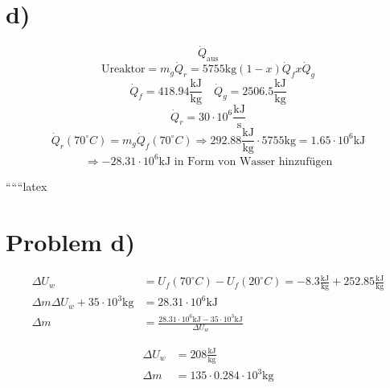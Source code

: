 

\section*{d)}
\[
\dot{Q}_{\text{aus}}
\]
\[
\text{Ureaktor} = m_g \dot{Q}_r = 5755 \text{kg} (1 - x) \dot{Q}_f x \dot{Q}_g
\]
\[
\dot{Q}_f = 418.94 \frac{\text{kJ}}{\text{kg}} \quad \dot{Q}_g = 2506.5 \frac{\text{kJ}}{\text{kg}}
\]
\[
\dot{Q}_r = 30 \cdot 10^6 \frac{\text{kJ}}{\text{s}}
\]
\[
\dot{Q}_r (70^\circ C) = m_g \dot{Q}_f (70^\circ C) \Rightarrow 292.88 \frac{\text{kJ}}{\text{kg}} \cdot 5755 \text{kg} = 1.65 \cdot 10^6 \text{kJ}
\]
\[
\Rightarrow -28.31 \cdot 10^6 \text{kJ} \text{ in Form von Wasser hinzufügen}
\]

``````latex

\section*{Problem d)}

\begin{align*}
\Delta U_w &= U_f(70^\circ C) - U_f(20^\circ C) = -8.3 \frac{\text{kJ}}{\text{kg}} + 252.85 \frac{\text{kJ}}{\text{kg}} \\
\Delta m \Delta U_w + 35 \cdot 10^3 \text{kg} &= 28.31 \cdot 10^6 \text{kJ} \\
\Delta m &= \frac{28.31 \cdot 10^6 \text{kJ} - 35 \cdot 10^3 \text{kJ}}{\Delta U_w}
\end{align*}

\begin{align*}
\Delta U_w &= 208 \frac{\text{kJ}}{\text{kg}} \\
\Delta m &= 135 \cdot 0.284 \cdot 10^3 \text{kg}
\end{align*}